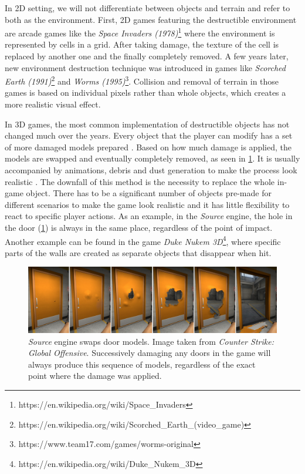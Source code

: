 In 2D setting, we will not differentiate between objects and terrain and refer to both as the environment. 
First, 2D games featuring the destructible environment are arcade games like the \emph{Space Invaders (1978)}\footnote{https://en.wikipedia.org/wiki/Space\_Invaders} where the environment is represented by cells in a grid. After taking damage, the texture  of the cell is replaced by another one and the finally completely removed. A few  years later, new environment destruction technique was introduced in games like \emph{Scorched Earth (1991)}\footnote{https://en.wikipedia.org/wiki/Scorched\_Earth\_(video\_game)} and \emph{Worms (1995)}\footnote{https://www.team17.com/games/worms-original}. Collision and removal of terrain in those games is based on individual pixels rather than whole objects, which creates a more realistic visual effect.

In 3D games, the most common implementation of destructible objects has not changed much over the years. Every object that the player can modify has a set of more damaged models prepared . Based on how much damage is applied, the models are swapped and eventually completely removed, as seen in \cref{fig:doors}. It  is usually accompanied by animations, debris and dust generation to make the process look realistic . The downfall  of this method is the necessity to replace the whole in-game object. There has to be a significant number of objects pre-made for different scenarios to make the game look realistic and it  has little flexibility to react to specific player actions. As an example, in the \emph{Source} engine, the hole in the door (\cref{fig:doors}) is always in the same place, regardless of the point of impact. Another example can be found in the game \emph{Duke Nukem 3D}\footnote{https://en.wikipedia.org/wiki/Duke\_Nukem\_3D}, where specific parts of the walls are created as separate objects that disappear when hit.

\begin{figure} 
\centering
\includegraphics[width=\textwidth]{img/doors}
\caption{\emph{Source} engine swaps door models. Image taken from \emph{Counter Strike: Global Offensive}. Successively damaging any doors in the game will always produce this sequence of models, regardless of the exact point where the damage was applied.}
\label{fig:doors}
\end{figure}

